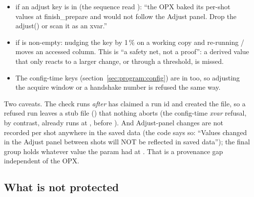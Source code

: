 \begin{itemize}[nosep]
  \item {} if an adjust key is in 
    (the sequence read ): ``the OPX baked its per-shot
    values at finish\_prepare and would not follow the Adjust panel. Drop the
    adjust() or scan it as an xvar.''
  \item {} if 
    is non-empty: nudging the key by 1\,\% on a working copy and re-running
    / moves an accessed
    column. This is ``a safety net, not a proof'': a derived value that only
    reacts to a larger change, or through a threshold, is missed.
  \item The config-time keys (section~\ref{sec:program:config}) are in
     too, so adjusting the acquire window or a handshake
    number is refused the same way.
\end{itemize}

Two caveats. The check runs \emph{after}  has
claimed a run id and created the file, so a refused run leaves a stub file
() that nothing aborts (the config-time
\emph{xvar} refusal, by contrast, already runs at , before
). And Adjust-panel changes
are not recorded per shot anywhere in the saved data (the code says so:
``Values changed in the Adjust panel between shots will NOT be reflected in
saved data''); the final  group holds whatever value the param
had at . That is a provenance gap independent of the OPX.

\subsection{What is not protected}
\label{sec:midloop:holes}

